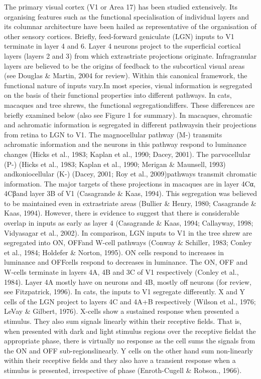 	The primary visual cortex (V1 or Area 17) has been studied extensively. Its organising features such as the functional specialisation of individual layers and its columnar architecture have been hailed as representative of the organisation of other sensory cortices. Briefly, feed-forward geniculate (LGN) inputs to V1 terminate in layer 4 and 6. Layer 4 neurons project to the superficial cortical layers (layers 2 and 3) from which extrastriate projections originate. Infragranular layers are believed to be the origins of feedback to the subcortical visual areas (see Douglas \& Martin, 2004 for review). 
	Within this canonical framework, the functional nature of inputs vary.In most species, visual information is segregated on the basis of their functional properties into different pathways. In cats, macaques and tree shrews, the functional segregationdiffers. These differences are briefly examined below (also see Figure 1 for summary).
	In macaques, chromatic and achromatic information is segregated in different pathwaysin their projections from retina to LGN to V1. The magnocellular pathway (M-) transmits achromatic information and the neurons in this pathway respond to luminance changes (Hicks et al., 1983; Kaplan et al., 1990; Dacey, 2001). The parvocellular (P-) (Hicks et al., 1983; Kaplan et al., 1990; Merigan \& Maunsell, 1993) andkoniocellular (K-) (Dacey, 2001; Roy et al., 2009)pathways transmit chromatic information. The  major targets of these projections in macaques are in layer 4Cα, 4Cβand layer 3B of V1 (Casagrande \& Kaas, 1994). This segregation was believed to be maintained even in extrastriate areas (Bullier \& Henry, 1980; Casagrande \& Kaas, 1994). However, there is evidence to suggest that there is considerable overlap in inputs as early as layer 4 (Casagrande \& Kaas, 1994; Callayway, 1998; Vidyasagar et al., 2002).
	In comparison, LGN inputs to V1 in the tree shrew are segregated into ON, OFFand W-cell pathways (Conway \& Schiller, 1983; Conley et al., 1984; Holdefer \& Norton, 1995). ON cells respond to increases in luminance and OFFcells respond to decreases in luminance. The ON, OFF and W-cells terminate in layers 4A, 4B and 3C of V1 respectively (Conley et al., 1984). Layer 4A mostly have on neurons and 4B, mostly off neurons (for review, see Fitzpatrick, 1996).
	In cats, the inputs to V1 segregate differently. X and Y cells of the LGN project to layers 4C and 4A+B respectively (Wilson et al., 1976; LeVay \& Gilbert, 1976). X-cells show a sustained response when presented a stimulus. They also sum signals linearly within their receptive fields. That is, when presented with dark and light stimulus regions over the receptive fieldat the appropriate phase, there is virtually no response as the cell sums the signals from the ON and OFF sub-regionslinearly. Y cells on the other hand sum non-linearly within their receptive fields and they also have a transient response when a stimulus is presented, irrespective of phase (Enroth-Cugell \& Robson., 1966).
